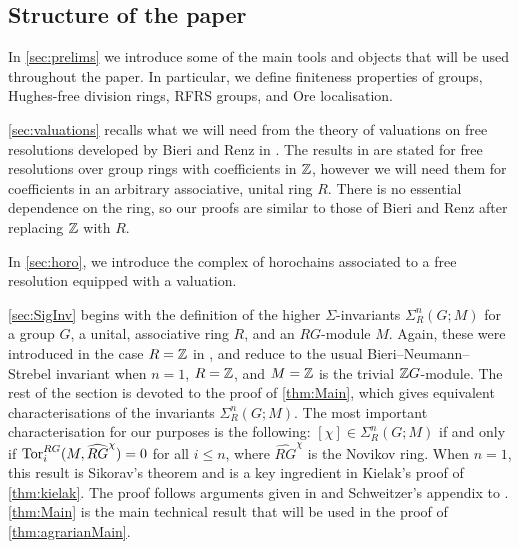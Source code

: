 \documentclass[11pt, letterpaper]{amsart}
\begin{document}
\subsection*{Structure of the paper} 

In \cref{sec:prelims} we introduce some of the main tools and objects that will be used throughout the paper. In particular, we define finiteness properties of groups, Hughes-free division rings, RFRS groups, and Ore localisation.

\cref{sec:valuations} recalls what we will need from the theory of valuations on free resolutions developed by Bieri and Renz in \cite{BieriRenzValutations}. The results in \cite{BieriRenzValutations} are stated for free resolutions over group rings with coefficients in $\mathbb{Z}$, however we will need them for coefficients in an arbitrary associative, unital ring $R$. There is no essential dependence on the ring, so our proofs are similar to those of Bieri and Renz after replacing $\mathbb{Z}$ with $R$.

In \cref{sec:horo}, we introduce the complex of horochains associated to a free resolution equipped with a valuation.

\cref{sec:SigInv} begins with the definition of the higher $\Sigma$-invariants $\Sigma_R^n(G; M)$ for a group $G$, a unital, associative ring $R$, and an $RG$-module $M$. Again, these were introduced in the case $R = \mathbb{Z}$ in \cite{BieriRenzValutations}, and reduce to the usual Bieri--Neumann--Strebel invariant when $n = 1$, $R = \mathbb{Z}$, and $M = \mathbb{Z}$ is the trivial $\mathbb{Z} G$-module. The rest of the section is devoted to the proof of \cref{thm:Main}, which gives equivalent characterisations of the invariants $\Sigma_R^n(G; M)$. The most important characterisation for our purposes is the following: $[\chi] \in \Sigma_R^n(G;M)$ if and only if $\operatorname{Tor}_i^{RG}(M, \widehat{RG}^\chi) = 0$ for all $i \leqslant n$, where $\widehat{RG}^\chi$ is the Novikov ring. When $n = 1$, this result is Sikorav's theorem \cite{SikoravThese} and is a key ingredient in Kielak's proof of \cref{thm:kielak}. The proof follows arguments given in \cite{BieriRenzValutations} and Schweitzer's appendix to \cite{BieriDeficiency}. \cref{thm:Main} is the main technical result that will be used in the proof of \cref{thm:agrarianMain}. 
\end{document}
